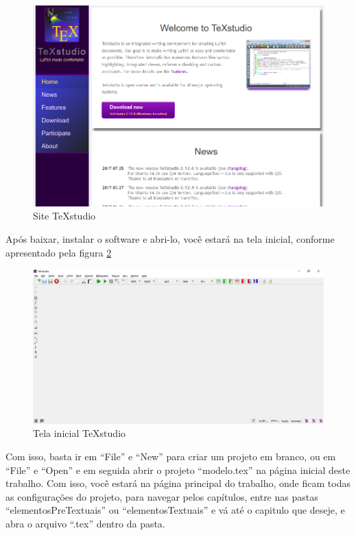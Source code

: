 \begin{figure}[htb]
	\caption{Site TeXstudio \label{fig_Cap1_siteTeXstudio}}
	\begin{center}
		\includegraphics[scale=0.4]{./Imagens/capitulo_1/siteTeXstudio.png}
	\end{center}
\end{figure}

Após baixar, instalar o software e abri-lo, você estará na tela inicial, conforme apresentado pela figura \ref{fig_Cap1_TeXstudio}

\begin{figure}[htb]
	\caption{Tela inicial TeXstudio\label{fig_Cap1_TeXstudio}}
	\begin{center}
		\includegraphics[scale=0.4]{./Imagens/capitulo_1/TeXstudio.png}
	\end{center}
\end{figure}
\newpage
Com isso, basta ir em ``File'' e ``New'' para criar um projeto em branco, ou em ``File'' e ``Open'' e em seguida abrir o projeto ``modelo.tex'' na página inicial deste trabalho. Com isso, você estará na página principal do trabalho, onde ficam todas as configurações do projeto, para navegar pelos capítulos, entre nas pastas ``elementosPreTextuais'' ou ``elementosTextuais'' e vá até o capitulo que deseje, e abra o arquivo ``.tex'' dentro da pasta. 

